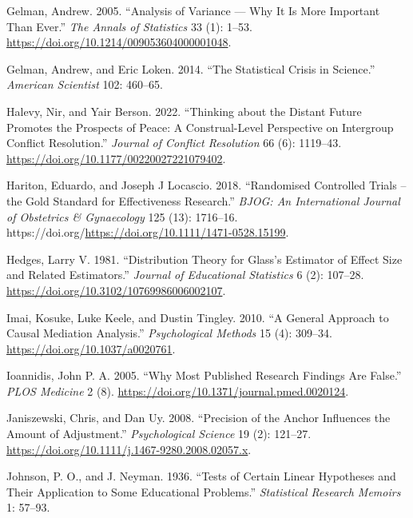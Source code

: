 \documentclass[
  11pt,
  letterpaper,
]{scrbook}
\newlength{\cslhangindent}
\newlength{\cslentryspacingunit} %
\newenvironment{CSLReferences}[2] %
 {%
  \setlength{\parindent}{0pt}
  \ifodd #1
  \let\oldpar\par
  \def\par{\hangindent=\cslhangindent\oldpar}
  \fi
  \setlength{\parskip}{#2\cslentryspacingunit}
 }%
 {}
\theoremstyle{definition}
\theoremstyle{remark}
\begin{document}
\begin{CSLReferences}{1}{0}
\leavevmode{}%
Gelman, Andrew. 2005. {``Analysis of Variance --- Why It Is More
Important Than Ever.''} \emph{The Annals of Statistics} 33 (1): 1--53.
\url{https://doi.org/10.1214/009053604000001048}.

\leavevmode{}%
Gelman, Andrew, and Eric Loken. 2014. {``The Statistical Crisis in
Science.''} \emph{American Scientist} 102: 460--65.

\leavevmode{}%
Halevy, Nir, and Yair Berson. 2022. {``Thinking about the Distant Future
Promotes the Prospects of Peace: A Construal-Level Perspective on
Intergroup Conflict Resolution.''} \emph{Journal of Conflict Resolution}
66 (6): 1119--43. \url{https://doi.org/10.1177/00220027221079402}.

\leavevmode{}%
Hariton, Eduardo, and Joseph J Locascio. 2018. {``Randomised Controlled
Trials -- the Gold Standard for Effectiveness Research.''} \emph{BJOG:
An International Journal of Obstetrics \& Gynaecology} 125 (13):
1716--16. https://doi.org/\url{https://doi.org/10.1111/1471-0528.15199}.

\leavevmode{}%
Hedges, Larry V. 1981. {``Distribution Theory for {G}lass's Estimator of
Effect Size and Related Estimators.''} \emph{Journal of Educational
Statistics} 6 (2): 107--28.
\url{https://doi.org/10.3102/10769986006002107}.

\leavevmode{}%
Imai, Kosuke, Luke Keele, and Dustin Tingley. 2010. {``A General
Approach to Causal Mediation Analysis.''} \emph{Psychological Methods}
15 (4): 309--34. \url{https://doi.org/10.1037/a0020761}.

\leavevmode{}%
Ioannidis, John P. A. 2005. {``Why Most Published Research Findings Are
False.''} \emph{PLOS Medicine} 2 (8).
\url{https://doi.org/10.1371/journal.pmed.0020124}.

\leavevmode{}%
Janiszewski, Chris, and Dan Uy. 2008. {``Precision of the Anchor
Influences the Amount of Adjustment.''} \emph{Psychological Science} 19
(2): 121--27. \url{https://doi.org/10.1111/j.1467-9280.2008.02057.x}.

\leavevmode{}%
Johnson, P. O., and J. Neyman. 1936. {``Tests of Certain Linear
Hypotheses and Their Application to Some Educational Problems.''}
\emph{Statistical Research Memoirs} 1: 57--93.


\end{CSLReferences}
\end{document}
